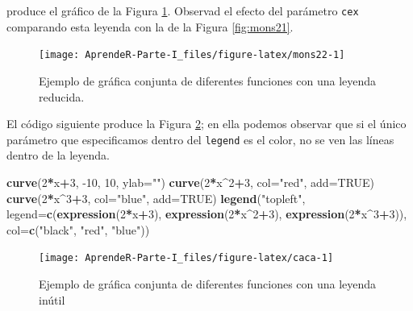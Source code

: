 \documentclass[]{book}
\newenvironment{Shaded}{\begin{snugshade}}{\end{snugshade}}
\newcommand{\DataTypeTok}[1]{\textcolor[rgb]{0.13,0.29,0.53}{#1}}
\newcommand{\DecValTok}[1]{\textcolor[rgb]{0.00,0.00,0.81}{#1}}
\newcommand{\KeywordTok}[1]{\textcolor[rgb]{0.13,0.29,0.53}{\textbf{#1}}}
\newcommand{\NormalTok}[1]{#1}
\newcommand{\OperatorTok}[1]{\textcolor[rgb]{0.81,0.36,0.00}{\textbf{#1}}}
\newcommand{\OtherTok}[1]{\textcolor[rgb]{0.56,0.35,0.01}{#1}}
\newcommand{\StringTok}[1]{\textcolor[rgb]{0.31,0.60,0.02}{#1}}
\theoremstyle{definition}
\theoremstyle{definition}
\theoremstyle{definition}
\theoremstyle{remark}
\begin{document}
produce el gráfico de la Figura \ref{fig:mons22}. Observad el efecto del parámetro \texttt{cex} comparando esta leyenda con la de la Figura \ref{fig:mons21}.

\begin{figure}

{\centering \texttt{[image: AprendeR-Parte-I\_files/figure-latex/mons22-1]} 

}

\caption{Ejemplo de gráfica conjunta de diferentes funciones con una leyenda reducida.}\label{fig:mons22}
\end{figure}

El código siguiente produce la Figura \ref{fig:caca}; en ella podemos observar que si el único parámetro que especificamos dentro del \texttt{legend} es el color, no se ven las líneas dentro de la leyenda.

\begin{Shaded}
\begin{Highlighting}[]
\KeywordTok{curve}\NormalTok{(}\DecValTok{2}\OperatorTok{*}\NormalTok{x}\OperatorTok{+}\DecValTok{3}\NormalTok{, }\DecValTok{-10}\NormalTok{, }\DecValTok{10}\NormalTok{, }\DataTypeTok{ylab=}\StringTok{""}\NormalTok{)}
\KeywordTok{curve}\NormalTok{(}\DecValTok{2}\OperatorTok{*}\NormalTok{x}\OperatorTok{^}\DecValTok{2}\OperatorTok{+}\DecValTok{3}\NormalTok{, }\DataTypeTok{col=}\StringTok{"red"}\NormalTok{, }\DataTypeTok{add=}\OtherTok{TRUE}\NormalTok{)}
\KeywordTok{curve}\NormalTok{(}\DecValTok{2}\OperatorTok{*}\NormalTok{x}\OperatorTok{^}\DecValTok{3}\OperatorTok{+}\DecValTok{3}\NormalTok{, }\DataTypeTok{col=}\StringTok{"blue"}\NormalTok{, }\DataTypeTok{add=}\OtherTok{TRUE}\NormalTok{)}
\KeywordTok{legend}\NormalTok{(}\StringTok{"topleft"}\NormalTok{, }\DataTypeTok{legend=}\KeywordTok{c}\NormalTok{(}\KeywordTok{expression}\NormalTok{(}\DecValTok{2}\OperatorTok{*}\NormalTok{x}\OperatorTok{+}\DecValTok{3}\NormalTok{), }\KeywordTok{expression}\NormalTok{(}\DecValTok{2}\OperatorTok{*}\NormalTok{x}\OperatorTok{^}\DecValTok{2}\OperatorTok{+}\DecValTok{3}\NormalTok{), }
                           \KeywordTok{expression}\NormalTok{(}\DecValTok{2}\OperatorTok{*}\NormalTok{x}\OperatorTok{^}\DecValTok{3}\OperatorTok{+}\DecValTok{3}\NormalTok{)), }\DataTypeTok{col=}\KeywordTok{c}\NormalTok{(}\StringTok{"black"}\NormalTok{, }\StringTok{"red"}\NormalTok{, }\StringTok{"blue"}\NormalTok{))}
\end{Highlighting}
\end{Shaded}

\begin{figure}

{\centering \texttt{[image: AprendeR-Parte-I\_files/figure-latex/caca-1]} 

}

\caption{Ejemplo de gráfica conjunta de diferentes funciones con una leyenda inútil}\label{fig:caca}
\end{figure}
\end{document}
